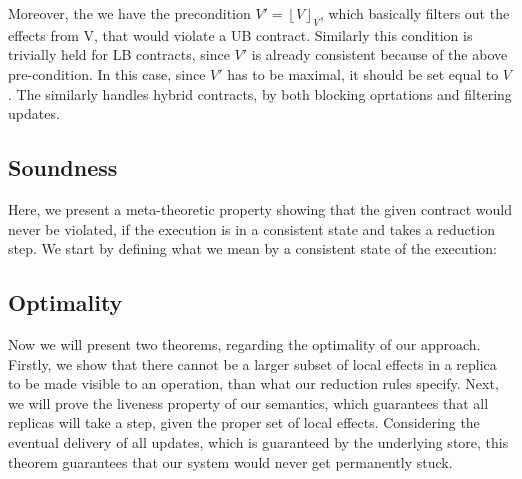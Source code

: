 Moreover, the we have the precondition $V' = \left \lfloor V \right
\rfloor_V$, which basically filters out the effects from V, that would
violate a UB contract. Similarly this condition is trivially held for LB
contracts, since $V'$ is
already consistent because of the above pre-condition. In this case,
since $V'$ has
to be maximal, it should be set equal to $V$. The 
similarly handles hybrid contracts, by both blocking oprtations and
filtering updates.

\subsection{Soundness}
\label{subsec:sound}
Here, we present a meta-theoretic property showing that the given contract would never be
violated, if the execution is in a consistent state and takes a reduction
step. We start by defining what we mean by a consistent state of the
execution: 


\subsection{Optimality}
\label{subsec:opt}
Now we will present two theorems, regarding the optimality of our
approach. Firstly, we show that there
cannot be a larger subset of local effects in a replica to be made
visible to an operation, than what
our reduction rules specify. Next, we will prove the liveness property
of our semantics, which guarantees that all replicas will take a step,
given the proper set of local effects. Considering the eventual delivery of all
updates, which is guaranteed by the underlying store, this theorem
guarantees  that our system would never get permanently stuck. 



